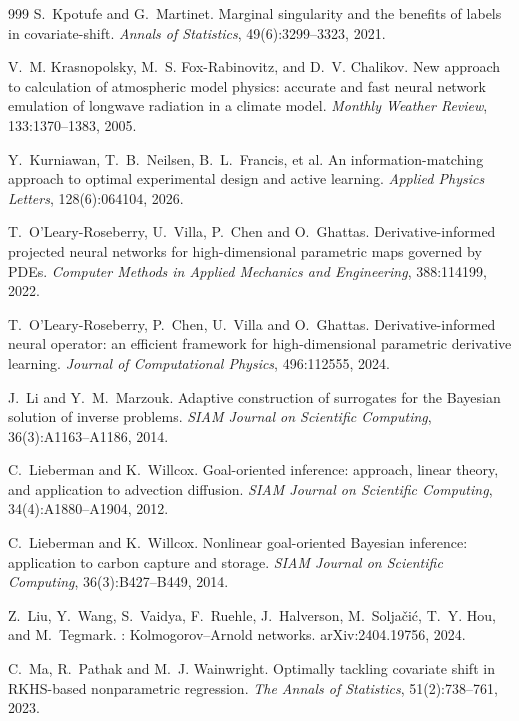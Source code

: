 \begin{thebibliography}{999}
S.~Kpotufe and G.~Martinet.
\newblock Marginal singularity and the benefits of labels in covariate-shift.
\newblock \emph{Annals of Statistics}, 49(6):3299--3323, 2021.

V.~M. Krasnopolsky, M.~S. Fox-Rabinovitz, and D.~V. Chalikov.
\newblock New approach to calculation of atmospheric model physics: accurate and fast neural
network emulation of longwave radiation in a climate model.
\newblock \emph{Monthly Weather Review}, 133:1370--1383, 2005.

Y.~Kurniawan, T.~B.~Neilsen, B.~L.~Francis, et al.
\newblock An information-matching approach to optimal experimental design and active learning.
\newblock \emph{Applied Physics Letters}, 128(6):064104, 2026.

T.~O'Leary-Roseberry, U.~Villa, P.~Chen and O.~Ghattas.
\newblock Derivative-informed projected neural networks for high-dimensional parametric maps governed by PDEs.
\newblock \emph{Computer Methods in Applied Mechanics and Engineering}, 388:114199, 2022.

T.~O'Leary-Roseberry, P.~Chen, U.~Villa and O.~Ghattas.
\newblock Derivative-informed neural operator: an efficient framework for high-dimensional parametric derivative learning.
\newblock \emph{Journal of Computational Physics}, 496:112555, 2024.

J.~Li and Y.~M.~Marzouk.
\newblock Adaptive construction of surrogates for the Bayesian solution of inverse problems.
\newblock \emph{SIAM Journal on Scientific Computing}, 36(3):A1163--A1186, 2014.

C.~Lieberman and K.~Willcox.
\newblock Goal-oriented inference: approach, linear theory, and application to advection diffusion.
\newblock \emph{SIAM Journal on Scientific Computing}, 34(4):A1880--A1904, 2012.

C.~Lieberman and K.~Willcox.
\newblock Nonlinear goal-oriented Bayesian inference: application to carbon capture and storage.
\newblock \emph{SIAM Journal on Scientific Computing}, 36(3):B427--B449, 2014.

Z.~Liu, Y.~Wang, S.~Vaidya, F.~Ruehle, J.~Halverson, M.~Solja\v{c}i\'c, T.~Y. Hou, and
M.~Tegmark.
: {Kolmogorov--Arnold} networks.
\newblock arXiv:2404.19756, 2024.

C.~Ma, R.~Pathak and M.~J. Wainwright.
\newblock Optimally tackling covariate shift in {RKHS}-based nonparametric regression.
\newblock \emph{The Annals of Statistics}, 51(2):738--761, 2023.


\end{thebibliography}
